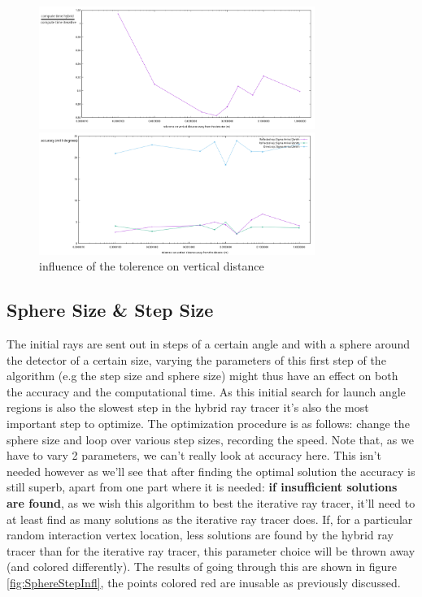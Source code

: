 \documentclass[11pt,a4paper,faculty=we,language=en,doctype=report]{cls/ugent-doc}
\begin{document}
\begin{figure}
	\centering
	\begin{minipage}{\textwidth}
		\includegraphics[width=0.8\textwidth]{figures/ZtolVsTime2.pdf}
	\end{minipage}
	\begin{minipage}{\textwidth}
		\includegraphics[width=0.8\textwidth]{figures/ZtolVsSigmaAZ.pdf}
	\end{minipage}
\caption{influence of the tolerence on vertical distance}
\label{fig:ztolinfl2}
\end{figure}

\subsection{Sphere Size \& Step Size}
The initial rays are sent out in steps of a certain angle and with a sphere
around the detector of a certain size, varying the parameters of this first
step of the algorithm (e.g the step size and sphere size) might thus have an
effect on both the accuracy and the computational time.  As this initial search
for launch angle regions is also the slowest step in the hybrid ray tracer it's
also the most important step to optimize. The optimization procedure is as
follows: change the sphere size and loop over various step sizes, recording the
speed. Note that, as we have to vary 2 parameters, we can't really look at
accuracy here. This isn't needed however as we'll see that after finding the
optimal solution the accuracy is still superb, apart from one part where it is
needed: \textbf{if insufficient solutions are found}, as we wish this algorithm
to best the iterative ray tracer, it'll need to at least find as many solutions
as the iterative ray tracer does.  If, for a particular random interaction
vertex location, less solutions are found by the hybrid ray tracer than for the
iterative ray tracer, this parameter choice will be thrown away (and colored
differently).  The results of going through this are shown in figure
\ref{fig:SphereStepInfl}, the points colored red are inusable as previously
discussed.
\end{document}
